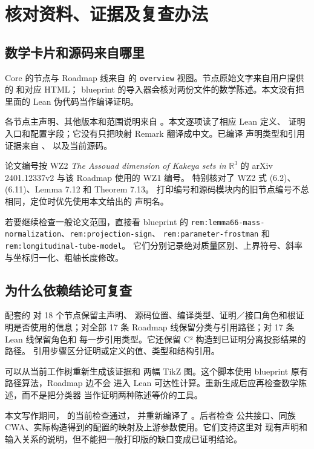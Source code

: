 \documentclass[UTF8,11pt,a4paper,fontset=none]{ctexart}
\newcommand{\R}{\mathbb R}
\DeclareRobustCommand{\id}[1]{\nolinkurl{#1}}
\begin{document}
\section{核对资料、证据及复查办法}

\subsection{数学卡片和源码来自哪里}

Core 的节点与 Roadmap 线来自  的
\id{overview} 视图。节点原始文字来自用户提供的
 和对应 HTML；
blueprint 的导入器会核对两份文件的数学陈述。本文没有把里面的 Lean
伪代码当作编译证明。

各节点主声明、其他版本和范围说明来自
。本文逐项读了相应 Lean 定义、
证明入口和配置字段；它没有只把映射 Remark 翻译成中文。已编译
声明类型和引用证据来自 、
 以及当前源码。

论文编号按 WZ2 \emph{The Assouad dimension of Kakeya sets in
$\R^3$} 的 arXiv 2401.12337v2 与该 Roadmap 使用的 WZ1 编号。
特别核对了 WZ2 式 (6.2)、(6.11)、Lemma 7.12 和 Theorem 7.13。
打印编号和源码模块内的旧节点编号不总相同，定位时优先使用本文给出的
声明名。

若要继续检查一般论文范围，直接看 blueprint 的
\id{rem:lemma66-mass-normalization}、\id{rem:projection-sign}、
\id{rem:parameter-frostman} 和 \id{rem:longitudinal-tube-model}。
它们分别记录绝对质量区别、上界符号、斜率与坐标归一化、粗轴长度修改。

\subsection{为什么依赖结论可复查}

配套的  对 18 个节点保留主声明、
源码位置、编译类型、证明／接口角色和根证明是否使用的信息；对全部
17 条 Roadmap 线保留分类与引用路径；对 17 条 Lean 线保留角色和
每一步引用类型。它还保留 C² 构造到已证明分离投影结果的路径。
引用步骤区分证明或定义的值、类型和结构引用。

 可以从当前工作树重新生成该证据和
两幅 TikZ 图。这个脚本使用 blueprint 原有路径算法，Roadmap 边不会
进入 Lean 可达性计算。重新生成后应再检查数学陈述，而不是把分类器
当作证明两种陈述等价的工具。

本文写作期间， 的当前检查通过，
并重新编译了 。后者检查
公共接口、同族 CWA、实际构造得到的配置的映射及上游参数使用。它们支持这里对
现有声明和输入关系的说明，但不能把一般打印版的缺口变成已证明结论。
\end{document}
